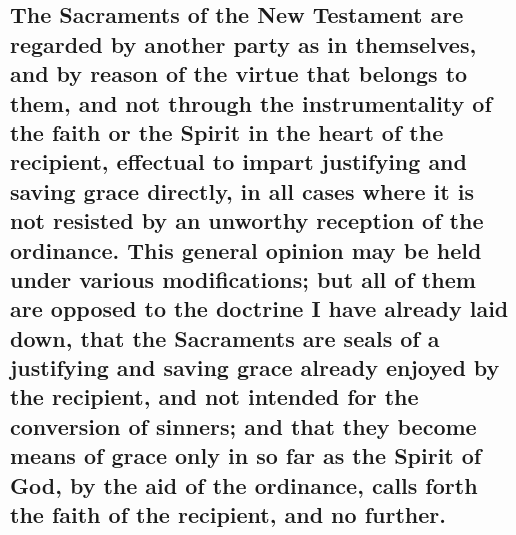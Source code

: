 \documentclass[english,]{book}
\begin{document}
\hypertarget{the-sacraments-of-the-new-testament-are-regarded-by-another-party-as-in-themselves-and-by-reason-of-the-virtue-that-belongs-to-them-and-not-through-the-instrumentality-of-the-faith-or-the-spirit-in-the-heart-of-the-recipient-effectual-to-impart-justifying-and-saving-grace-directly-in-all-cases-where-it-is-not-resisted-by-an-unworthy-reception-of-the-ordinance.-this-general-opinion-may-be-held-under-various-modifications-but-all-of-them-are-opposed-to-the-doctrine-i-have-already-laid-down-that-the-sacraments-are-seals-of-a-justifying-and-saving-grace-already-enjoyed-by-the-recipient-and-not-intended-for-the-conversion-of-sinners-and-that-they-become-means-of-grace-only-in-so-far-as-the-spirit-of-god-by-the-aid-of-the-ordinance-calls-forth-the-faith-of-the-recipient-and-no-further.}{%
\subsection{The Sacraments of the New Testament are regarded by another party as in themselves, and by reason of the virtue that belongs to them, and not through the instrumentality of the faith or the Spirit in the heart of the recipient, effectual to impart justifying and saving grace directly, in all cases where it is not resisted by an unworthy reception of the ordinance. This general opinion may be held under various modifications; but all of them are opposed to the doctrine I have already laid down, that the Sacraments are seals of a justifying and saving grace already enjoyed by the recipient, and not intended for the conversion of sinners; and that they become means of grace only in so far as the Spirit of God, by the aid of the ordinance, calls forth the faith of the recipient, and no further.}\label{the-sacraments-of-the-new-testament-are-regarded-by-another-party-as-in-themselves-and-by-reason-of-the-virtue-that-belongs-to-them-and-not-through-the-instrumentality-of-the-faith-or-the-spirit-in-the-heart-of-the-recipient-effectual-to-impart-justifying-and-saving-grace-directly-in-all-cases-where-it-is-not-resisted-by-an-unworthy-reception-of-the-ordinance.-this-general-opinion-may-be-held-under-various-modifications-but-all-of-them-are-opposed-to-the-doctrine-i-have-already-laid-down-that-the-sacraments-are-seals-of-a-justifying-and-saving-grace-already-enjoyed-by-the-recipient-and-not-intended-for-the-conversion-of-sinners-and-that-they-become-means-of-grace-only-in-so-far-as-the-spirit-of-god-by-the-aid-of-the-ordinance-calls-forth-the-faith-of-the-recipient-and-no-further.}}
\end{document}
